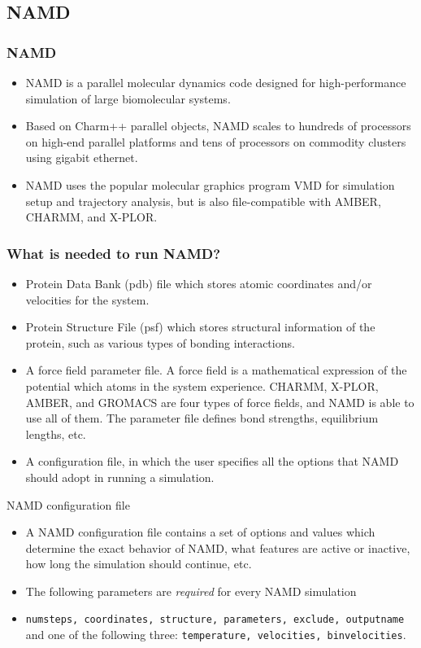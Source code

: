 \documentclass[slidestop,mathserif,compress,xcolor=svgnames]{beamer}
\newenvironment{bblock}[0]
{
\begin{beamerboxesrounded}[upper=uppercol1,lower=lowercol1,shadow=true]}
{\end{beamerboxesrounded}}
\begin{document}
\subsection{NAMD}
\begin{frame}
  \frametitle{\small NAMD}
  \begin{bblock}{}
    \begin{itemize}
      \item NAMD is a parallel molecular dynamics code designed for high-performance simulation of large biomolecular systems. 
      \item Based on Charm++ parallel objects, NAMD scales to hundreds of processors on high-end parallel platforms and tens of processors on commodity clusters using gigabit ethernet.
      \item NAMD uses the popular molecular graphics program VMD for simulation setup and trajectory analysis, but is also file-compatible with AMBER, CHARMM, and X-PLOR.
    \end{itemize}
  \end{bblock}
\end{frame}

\begin{frame}
  \frametitle{\small What is needed to run NAMD?}
  \begin{itemize}
    \item Protein Data Bank (pdb) file which stores atomic coordinates and/or velocities for the system.
    \item Protein Structure File (psf) which stores structural information of the protein, such as various types of bonding interactions.
    \item A force field parameter file. A force field is a mathematical expression of the potential which atoms in the system experience. CHARMM, X-PLOR, AMBER, and GROMACS are four types of force fields, and NAMD is able to use all of them. The parameter file defines bond strengths, equilibrium lengths, etc. 
    \item A configuration file, in which the user specifies all the options that NAMD should adopt in running a simulation.
  \end{itemize}
  \begin{bblock}{NAMD configuration file}
    \begin{itemize}
      \item A NAMD configuration file contains a set of options and values which determine the exact behavior of NAMD, what features are active or inactive, how long the simulation should continue, etc.
      \item The following parameters are \textit{required} for every NAMD simulation
      \item[] \texttt{numsteps, coordinates, structure, parameters, exclude, outputname} and one of the following three: \texttt{temperature, velocities, binvelocities}.
    \end{itemize}
  \end{bblock}
\end{frame}
\end{document}

